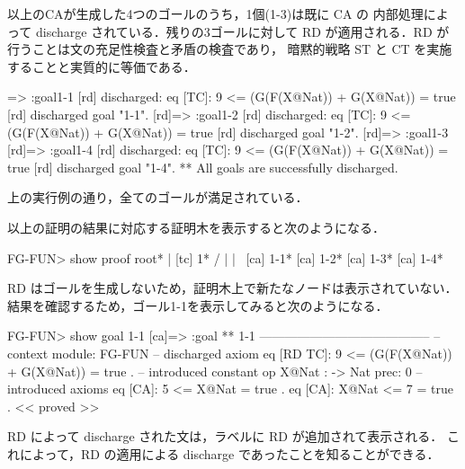 \documentclass[a4paper,oneside,10pt,here]{memoir}
\newenvironment{vvtm}%
{\parskip=0pt\lineskip=0pt\begin{center}\begin{minipage}{0.8\textwidth}\begin{snugshade}}%
  {\end{snugshade}\end{minipage}\end{center}}
\begin{document}
以上のCAが生成した4つのゴールのうち，1個(1-3)は既に CA の
内部処理によって discharge されている．残りの3ゴールに対して
RD が適用される．RD が行うことは文の充足性検査と矛盾の検査であり，
暗黙的戦略 ST と CT を実施することと実質的に等価である．

\begin{vvtm}
\begin{simplev}
[rd]=> :goal{1-1}
[rd] discharged: 
  eq [TC]: 9 <= (G(F(X@Nat)) + G(X@Nat))
      = true
[rd] discharged goal "1-1".
[rd]=> :goal{1-2}
[rd] discharged: 
  eq [TC]: 9 <= (G(F(X@Nat)) + G(X@Nat))
      = true
[rd] discharged goal "1-2".
[rd]=> :goal{1-3}
[rd]=> :goal{1-4}
[rd] discharged: 
  eq [TC]: 9 <= (G(F(X@Nat)) + G(X@Nat))
      = true
[rd] discharged goal "1-4".
** All goals are successfully discharged.
  \end{simplev}
\end{vvtm}

上の実行例の通り，全てのゴールが満足されている．

以上の証明の結果に対応する証明木を表示すると次のようになる．
\begin{vvtm}
  \begin{simplev}
FG-FUN> show proof
                  root*                   
                    |                      
                 [tc] 1*                  
    /          |          |          \     
[ca] 1-1*  [ca] 1-2*  [ca] 1-3*  [ca] 1-4*
  \end{simplev}
\end{vvtm}
RD はゴールを生成しないため，証明木上で新たなノードは表示されていない．
結果を確認するため，ゴール1-1を表示してみると次のようになる．
\begin{vvtm}
  \begin{simplev}
FG-FUN> show goal 1-1
[ca]=>
:goal { ** 1-1 -----------------------------------------
  -- context module: FG-FUN
  -- discharged axiom
    eq [RD TC]: 9 <= (G(F(X@Nat)) + G(X@Nat))
        = true .
  -- introduced constant
    op X@Nat : -> Nat { prec: 0 }
  -- introduced axioms
    eq [CA]: 5 <= X@Nat = true .
    eq [CA]: X@Nat <= 7 = true .
} << proved >>
  \end{simplev}
\end{vvtm}
RD によって discharge された文は，ラベルに RD が追加されて表示される．
これによって，RD の適用による discharge であったことを知ることができる．



\end{document}
